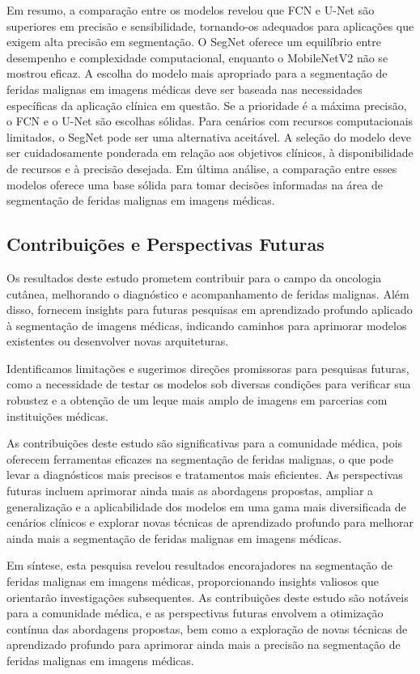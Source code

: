     Em resumo, a comparação entre os modelos revelou que \ac{FCN} e \ac{U-Net} são superiores em precisão e sensibilidade, tornando-os adequados para aplicações que exigem alta precisão em segmentação. O \ac{SegNet} oferece um equilíbrio entre desempenho e complexidade computacional, enquanto o \ac{MobileNetV2} não se mostrou eficaz. A escolha do modelo mais apropriado para a segmentação de feridas malignas em imagens médicas deve ser baseada nas necessidades específicas da aplicação clínica em questão. Se a prioridade é a máxima precisão, o \ac{FCN} e o \ac{U-Net} são escolhas sólidas. Para cenários com recursos computacionais limitados, o \ac{SegNet} pode ser uma alternativa aceitável. A seleção do modelo deve ser cuidadosamente ponderada em relação aos objetivos clínicos, à disponibilidade de recursos e à precisão desejada. Em última análise, a comparação entre esses modelos oferece uma base sólida para tomar decisões informadas na área de segmentação de feridas malignas em imagens médicas. 

\subsection{Contribuições e Perspectivas Futuras}

    Os resultados deste estudo prometem contribuir para o campo da oncologia cutânea, melhorando o diagnóstico e acompanhamento de feridas malignas. Além disso, fornecem insights para futuras pesquisas em aprendizado profundo aplicado à segmentação de imagens médicas, indicando caminhos para aprimorar modelos existentes ou desenvolver novas arquiteturas.

    Identificamos limitações e sugerimos direções promissoras para pesquisas futuras, como a necessidade de testar os modelos sob diversas condições para verificar sua robustez e a obtenção de um leque mais amplo de imagens em parcerias com instituições médicas.

    As contribuições deste estudo são significativas para a comunidade médica, pois oferecem ferramentas eficazes na segmentação de feridas malignas, o que pode levar a diagnósticos mais precisos e tratamentos mais eficientes. As perspectivas futuras incluem aprimorar ainda mais as abordagens propostas, ampliar a generalização e a aplicabilidade dos modelos em uma gama mais diversificada de cenários clínicos e explorar novas técnicas de aprendizado profundo para melhorar ainda mais a segmentação de feridas malignas em imagens médicas.

    Em síntese, esta pesquisa revelou resultados encorajadores na segmentação de feridas malignas em imagens médicas, proporcionando insights valiosos que orientarão investigações subsequentes. As contribuições deste estudo são notáveis para a comunidade médica, e as perspectivas futuras envolvem a otimização contínua das abordagens propostas, bem como a exploração de novas técnicas de aprendizado profundo para aprimorar ainda mais a precisão na segmentação de feridas malignas em imagens médicas.